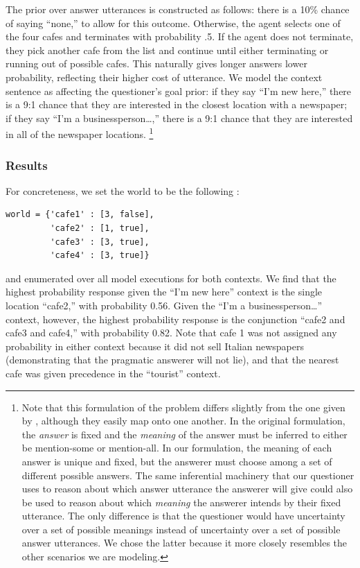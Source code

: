\documentclass[12pt, floatsintext, jou]{apa6}
\begin{document}
The prior over answer utterances is constructed as follows: there is a 10\% chance of saying ``none,'' to allow for this outcome. Otherwise, the agent selects one of the four cafes and terminates with probability .5. If the agent does not terminate, they pick another cafe from the list and continue until either terminating or running out of possible cafes.  This naturally gives longer answers lower probability, reflecting their higher cost of utterance. We model the context sentence as affecting the questioner's goal prior: if they say ``I'm new here,'' there is a 9:1 chance that they are interested in the closest location with a newspaper; if they say ``I'm a businessperson\dots,'' there is a 9:1 chance that they are interested in all of the newspaper locations. 
\footnote{Note that this formulation of the problem differs slightly from the one given by , although they easily map onto one another. In the original formulation, the \emph{answer} is fixed and the \emph{meaning} of the answer must be inferred to either be mention-some or mention-all. In our formulation, the meaning of each answer is unique and fixed, but the answerer must choose among a set of different possible answers. The same inferential machinery that our questioner uses to reason about which answer utterance the answerer will give could also be used to reason about which \emph{meaning} the answerer intends by their fixed utterance. The only difference is that the questioner would have uncertainty over a set of possible meanings instead of uncertainty over a set of possible answer utterances. We chose the latter because it more closely resembles the other scenarios we are modeling.}

\subsubsection{Results}

For concreteness, we set the world to be the following :

\begin{lstlisting}
world = {'cafe1' : [3, false],
         'cafe2' : [1, true],
         'cafe3' : [3, true],
         'cafe4' : [3, true]}
\end{lstlisting}
and enumerated over all model executions for both contexts. We find that the highest probability response given the ``I'm new here'' context is the single location ``cafe2,'' with probability 0.56. Given the ``I'm a businessperson\dots'' context, however, the highest probability response is the conjunction ``cafe2 and cafe3 and cafe4,'' with probability 0.82. Note that cafe 1 was not assigned any probability in either context because it did not sell Italian newspapers (demonstrating that the pragmatic answerer will not lie), and that the nearest cafe was given precedence in the ``tourist'' context. 
\end{document}
